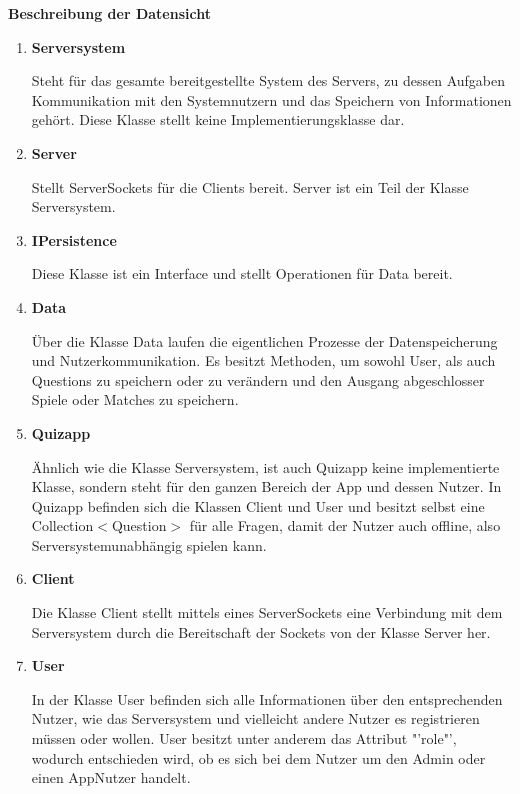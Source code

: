 \textbf{Beschreibung der Datensicht}

\begin{enumerate}
	\item{\textbf{Serversystem}}
	
	Steht für das gesamte bereitgestellte System des Servers, zu dessen Aufgaben Kommunikation mit den Systemnutzern und das Speichern
	von Informationen gehört. Diese Klasse stellt keine Implementierungsklasse dar.
	
	\item{\textbf{Server}}
	
	Stellt ServerSockets für die Clients bereit. Server ist ein Teil der Klasse Serversystem.
	
	\item{\textbf{IPersistence}}
	
	Diese Klasse ist ein Interface und stellt Operationen für Data bereit.
	
	\item{\textbf{Data}}
	
	Über die Klasse Data laufen die eigentlichen Prozesse der Datenspeicherung und Nutzerkommunikation. Es besitzt Methoden, um sowohl User, als auch
	Questions zu speichern oder zu verändern und den Ausgang abgeschlosser Spiele oder Matches zu speichern.
	
	\item{\textbf{Quizapp}}
	
	Ähnlich wie die Klasse Serversystem, ist auch Quizapp keine implementierte Klasse, sondern steht für den ganzen Bereich der App und dessen Nutzer.
	In Quizapp befinden sich die Klassen Client und User und besitzt selbst eine Collection$<$Question$>$ für alle Fragen, damit der Nutzer auch offline, also 
	Serversystemunabhängig spielen kann.
	
	\item{\textbf{Client}}
	
	Die Klasse Client stellt mittels eines ServerSockets eine Verbindung mit dem Serversystem durch die Bereitschaft der Sockets von der Klasse Server her.
	
	\item{\textbf{User}}
	
	In der Klasse User befinden sich alle Informationen über den entsprechenden Nutzer, wie das Serversystem und vielleicht andere Nutzer es registrieren 
	müssen oder wollen. User besitzt unter anderem das Attribut "'role"', wodurch entschieden wird, ob es sich bei dem Nutzer um den Admin oder einen AppNutzer handelt.
	

\end{enumerate}
